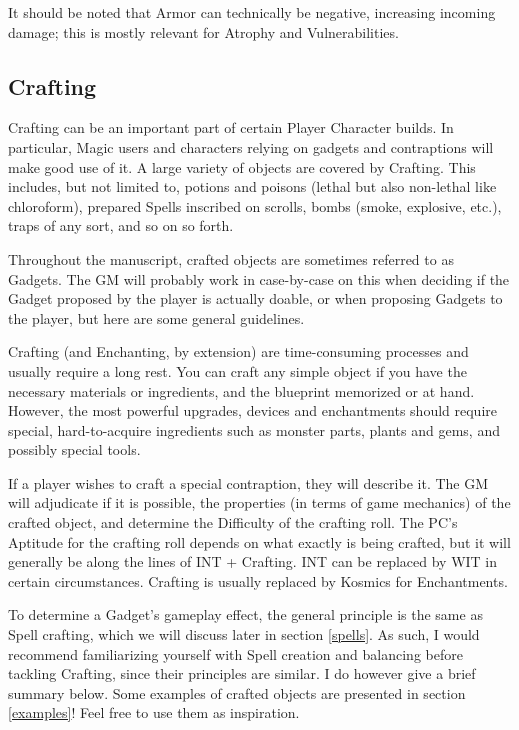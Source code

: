 It should be noted that Armor can technically be negative, increasing incoming damage; this is mostly relevant for Atrophy and Vulnerabilities.


\subsection{Crafting}

Crafting can be an important part of certain Player Character builds. In particular, Magic users and characters relying on gadgets and contraptions will make good use of it. A large variety of objects are covered by Crafting. This includes, but not limited to, potions and poisons (lethal but also non-lethal like chloroform), prepared Spells inscribed on scrolls, bombs (smoke, explosive, etc.), traps of any sort, and so on so forth.

Throughout the manuscript, crafted objects are sometimes referred to as Gadgets. The GM will probably work in case-by-case on this when deciding if the Gadget proposed by the player is actually doable, or when proposing Gadgets to the player, but here are some general guidelines. 

\label{crafting}

Crafting (and Enchanting, by extension) are time-consuming processes and usually require a long rest. You can craft any simple object if you have the necessary materials or ingredients, and the blueprint memorized or at hand. However, the most powerful upgrades, devices and enchantments should require special, hard-to-acquire ingredients such as monster parts, plants and gems, and possibly special tools. 

If a player wishes to craft a special contraption, they will describe it. The GM will adjudicate if it is possible, the properties (in terms of game mechanics) of the crafted object, and determine the Difficulty of the crafting roll. The PC's Aptitude for the crafting roll depends on what exactly is being crafted, but it will generally be along the lines of INT + Crafting. INT can be replaced by WIT in certain circumstances. Crafting is usually replaced by Kosmics for Enchantments.

To determine a Gadget's gameplay effect, the general principle is the same as Spell crafting, which we will discuss later in section \ref{spells}. As such, I would recommend familiarizing yourself with Spell creation and balancing before tackling Crafting, since their principles are similar. I do however give a brief summary below. 
Some examples of crafted objects are presented in section \ref{examples}! Feel free to use them as inspiration.

